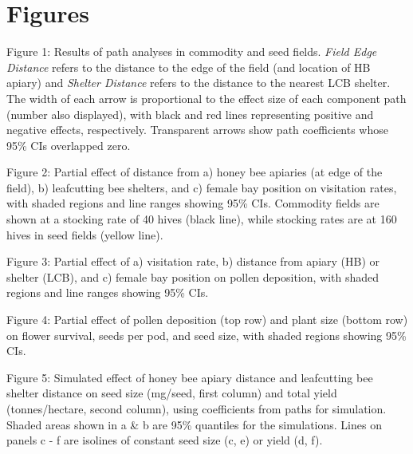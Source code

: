 \documentclass[12pt]{article} %
\begin{document}
\section*{Figures}

Figure 1: Results of path analyses in commodity and seed fields. \emph{Field Edge Distance} refers to the distance to the edge of the field (and location of HB apiary) and \emph{Shelter Distance} refers to the distance to the nearest LCB shelter. The width of each arrow is proportional to the effect size of each component path (number also displayed), with black and red lines representing positive and negative effects, respectively. Transparent arrows show path coefficients whose 95\% CIs overlapped zero.

\vspace{0.5cm}

Figure 2: Partial effect of distance from a) honey bee apiaries (at edge of the field), b) leafcutting bee shelters, and c) female bay position on visitation rates, with shaded regions and line ranges showing 95\% CIs. Commodity fields are shown at a stocking rate of 40 hives (black line), while stocking rates are at 160 hives in seed fields (yellow line).

\vspace{0.5cm}

Figure 3: Partial effect of a) visitation rate, b) distance from apiary (HB) or shelter (LCB), and c) female bay position on pollen deposition, with shaded regions and line ranges showing 95\% CIs.

\vspace{0.5cm}

Figure 4: Partial effect of pollen deposition (top row) and plant size (bottom row) on flower survival, seeds per pod, and seed size, with shaded regions showing 95\% CIs.

\vspace{0.5cm}

Figure 5: Simulated effect of honey bee apiary distance and leafcutting bee shelter distance on seed size (mg/seed, first column) and total yield (tonnes/hectare, second column), using coefficients from paths for simulation. Shaded areas shown in a \& b are 95\% quantiles for the simulations. Lines on panels c - f are isolines of constant seed size (c, e) or yield (d, f).

\clearpage
\end{document}
